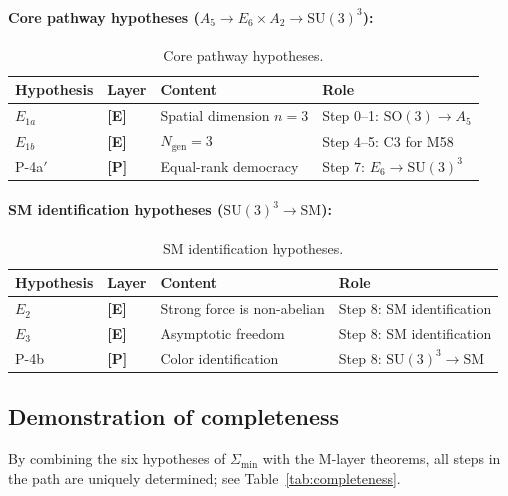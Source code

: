 \documentclass[sn-mathphys-num,Numbered]{sn-jnl}
\theoremstyle{thmstyleone}
\theoremstyle{thmstylethree}
\newcommand{\Amin}{\Sigma_{\min}}
\newcommand{\Ngen}{N_{\mathrm{gen}}}
\newcommand{\SU}{\mathrm{SU}}
\newcommand{\SO}{\mathrm{SO}}
\newcommand{\layerP}{\textbf{[P]}}
\newcommand{\layerE}{\textbf{[E]}}
\begin{document}
\paragraph{Core pathway hypotheses ($A_5 \to E_6 \times A_2 \to \SU(3)^3$):}

\begin{table}[htb]
\centering
\caption{Core pathway hypotheses.}\label{tab:core-hyp}
\begin{tabular}{llll}
\toprule
Hypothesis & Layer & Content & Role \\
\midrule
$E_{1a}$ & \layerE & Spatial dimension $n = 3$ & Step 0--1: $\SO(3) \to A_5$ \\
$E_{1b}$ & \layerE & $\Ngen = 3$ & Step 4--5: C3 for M58 \\
P-4a$'$ & \layerP & Equal-rank democracy & Step 7: $E_6 \to \SU(3)^3$ \\
\bottomrule
\end{tabular}
\end{table}

\paragraph{SM identification hypotheses ($\SU(3)^3 \to \text{SM}$):}

\begin{table}[htb]
\centering
\caption{SM identification hypotheses.}\label{tab:SM-hyp}
\begin{tabular}{llll}
\toprule
Hypothesis & Layer & Content & Role \\
\midrule
$E_2$ & \layerE & Strong force is non-abelian & Step 8: SM identification \\
$E_3$ & \layerE & Asymptotic freedom & Step 8: SM identification \\
P-4b & \layerP & Color identification & Step 8: $\SU(3)^3 \to \text{SM}$ \\
\bottomrule
\end{tabular}
\end{table}


\subsection{Demonstration of completeness}\label{sec:completeness}

By combining the six hypotheses of $\Amin$ with the M-layer theorems, all
steps in the path are uniquely determined; see Table~\ref{tab:completeness}.
\end{document}
